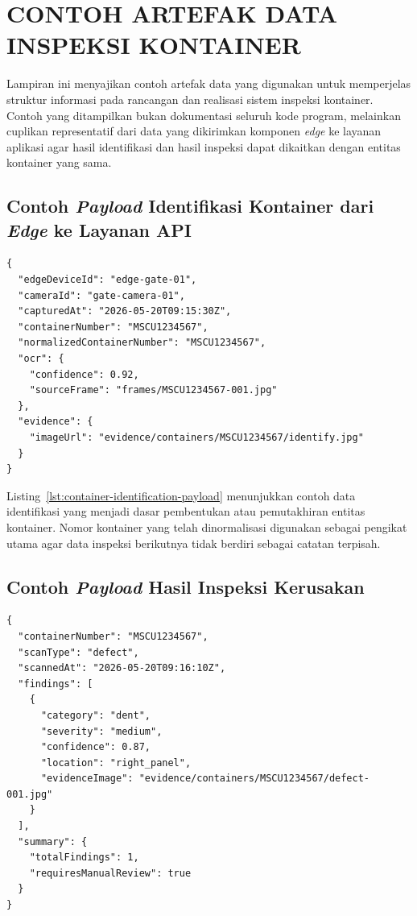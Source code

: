\cleardoublepage
\chapter{CONTOH ARTEFAK DATA INSPEKSI KONTAINER}

Lampiran ini menyajikan contoh artefak data yang digunakan untuk memperjelas
struktur informasi pada rancangan dan realisasi sistem inspeksi kontainer.
Contoh yang ditampilkan bukan dokumentasi seluruh kode program, melainkan
cuplikan representatif dari data yang dikirimkan komponen \textit{edge} ke
layanan aplikasi agar hasil identifikasi dan hasil inspeksi dapat dikaitkan
dengan entitas kontainer yang sama.

\section{Contoh \textit{Payload} Identifikasi Kontainer dari \textit{Edge} ke Layanan API}

\begin{lstlisting}[language={}, numbers=none, basicstyle=\ttfamily\scriptsize, breaklines=true, caption={Contoh payload identifikasi kontainer dari komponen edge ke layanan API}, label=lst:container-identification-payload]
{
  "edgeDeviceId": "edge-gate-01",
  "cameraId": "gate-camera-01",
  "capturedAt": "2026-05-20T09:15:30Z",
  "containerNumber": "MSCU1234567",
  "normalizedContainerNumber": "MSCU1234567",
  "ocr": {
    "confidence": 0.92,
    "sourceFrame": "frames/MSCU1234567-001.jpg"
  },
  "evidence": {
    "imageUrl": "evidence/containers/MSCU1234567/identify.jpg"
  }
}
\end{lstlisting}

Listing~\ref{lst:container-identification-payload} menunjukkan contoh data
identifikasi yang menjadi dasar pembentukan atau pemutakhiran entitas
kontainer. Nomor kontainer yang telah dinormalisasi digunakan sebagai pengikat
utama agar data inspeksi berikutnya tidak berdiri sebagai catatan terpisah.

\section{Contoh \textit{Payload} Hasil Inspeksi Kerusakan}

\begin{lstlisting}[language={}, numbers=none, basicstyle=\ttfamily\scriptsize, breaklines=true, caption={Contoh payload hasil inspeksi kerusakan kontainer}, label=lst:defect-scan-payload]
{
  "containerNumber": "MSCU1234567",
  "scanType": "defect",
  "scannedAt": "2026-05-20T09:16:10Z",
  "findings": [
    {
      "category": "dent",
      "severity": "medium",
      "confidence": 0.87,
      "location": "right_panel",
      "evidenceImage": "evidence/containers/MSCU1234567/defect-001.jpg"
    }
  ],
  "summary": {
    "totalFindings": 1,
    "requiresManualReview": true
  }
}
\end{lstlisting}

